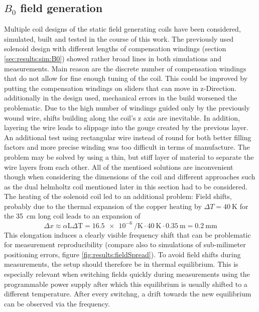         \subsection{$B_0$ field generation}
            Multiple coil designs of the static field generating coils have been considered, simulated, built and tested in the course of this work. The previously used solenoid design with different lengths of compensation windings (section \ref{sec:results:sim:B0}) showed rather broad lines in both simulations and measurements. Main reason are the discrete number of compensation windings that do not allow for fine enough tuning of the coil. This could be improved by putting the compensation windings on sliders that can move in z-Direction. additionally in the design used, mechanical errors in the build worsened the problematic. Due to the high number of windings guided only by the previously wound wire, shifts building along the coil's z axis are inevitable. In addition, layering the wire leads to slippage into the gouge created by the previous layer. An additional test using rectangular wire instead of round for both better filling factors and more precise winding was too difficult in terms of manufacture. The problem may be solved by using a thin, but stiff layer of material to separate the wire layers from each other. All of the mentioed solutions are inconvenient though when considering the dimensions of the coil and different approaches such as the dual helmholtz coil mentioned later in this section had to be considered.
            The heating of the solenoid coil led to an additional problem: Field shifts, probably due to the thermal expansion of the copper heating by $\Delta T = \SI{40}{\kelvin}$ for the \SI{35}{\centi\meter} long coil leads to an expansion of 
            \begin{equation}
                \Delta x \approx \alpha \mathrm{L}\Delta\mathrm{T}= \SI{16.5e-6}{\per\kelvin}\cdot \SI{40}{\kelvin} \cdot \SI{0.35}{\meter} = \SI{0.2}{\milli\meter}
            \end{equation}
            This elongation induces a clearly visible frequency shift that can be problematic for measurement reproducibility (compare also to simulations of sub-milimeter positioning errors, figure \ref{fig:results:fieldSpread}).
            To avoid field shifts during measurements, the setup should therefore be in thermal equilibrium. This is especially relevant when switching fields quickly during measurements using the programmable power supply after which this equilibrium is usually shifted to a different temperature. After every switchng, a drift towards the new equilibrium can be observed via the frequency.
